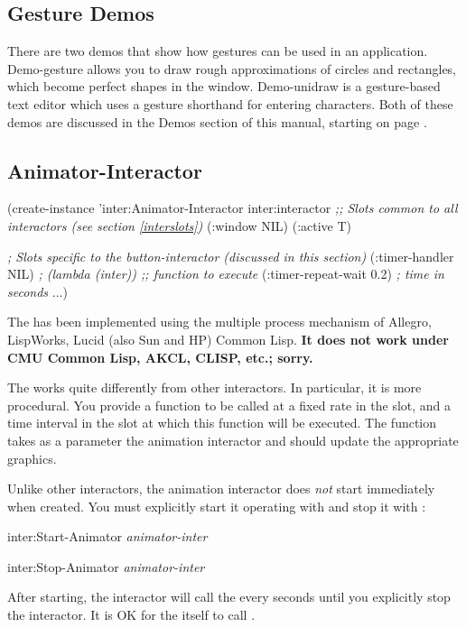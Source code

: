 \subsection{Gesture Demos}

There are two demos that show how gestures can be used in an application.
Demo-gesture allows you to draw rough approximations of circles and
rectangles, which become perfect shapes in the window.  Demo-unidraw is
a gesture-based text editor which uses a gesture shorthand for entering
characters.  Both of these demos are discussed in the Demos section of
this manual, starting on page \value{demos-first-page}.


\begin{group}
\section{Animator-Interactor}
\label{animation}

\begin{programexample}
(create-instance 'inter:Animator-Interactor inter:interactor
  {\it ;; Slots common to all interactors (see section \ref{interslots})}
  (:window NIL)
  (:active T)

  {\it ; Slots specific to the button-interactor (discussed in this section)}
  (:timer-handler NIL)         {\it ; (lambda (inter))  ;; function to execute}
  (:timer-repeat-wait 0.2)     {\it ; time in seconds}
...)
\end{programexample}
\end{group}


The  has been implemented using the
multiple process mechanism of Allegro, LispWorks, Lucid (also Sun and
HP) Common Lisp.  {\bf It does not
work under CMU Common Lisp, AKCL, CLISP, etc.; sorry.}

The  works quite differently from other
interactors.  In particular, it is more procedural.
You provide a function to be called at a fixed rate in the 
slot, and a time interval in the slot  at which this
function will be executed.
The  function takes as a parameter the animation
interactor and should update the appropriate graphics.

Unlike other interactors, the animation interactor does {\it not} start
immediately when created.  You must explicitly start it operating with
 and stop it with :
\begin{programexample}
inter:Start-Animator {\it animator-inter}\value{function}

inter:Stop-Animator {\it animator-inter}\value{function}
\end{programexample}
After starting, the interactor will call the  every
 seconds until you explicitly stop the
interactor.  It is OK for the  itself to call
.

